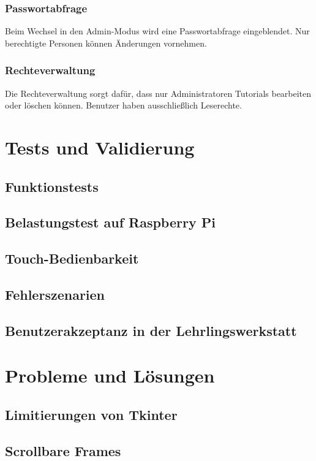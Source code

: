 \documentclass[12pt,a4paper]{report}
\begin{document}
    \subsection{Passwortabfrage}
        Beim Wechsel in den Admin-Modus wird eine Passwortabfrage eingeblendet. Nur berechtigte Personen können Änderungen vornehmen.
    \subsection{Rechteverwaltung}
    Die Rechteverwaltung sorgt dafür, dass nur Administratoren Tutorials bearbeiten oder löschen können. Benutzer haben ausschließlich Leserechte.


\chapter{Tests und Validierung}


    \section{Funktionstests}
    \section{Belastungstest auf Raspberry Pi}
    \section{Touch-Bedienbarkeit}
    \section{Fehlerszenarien}
    \section{Benutzerakzeptanz in der Lehrlingswerkstatt}


\chapter{Probleme und Lösungen}


    \section{Limitierungen von Tkinter}
    \section{Scrollbare Frames}
\end{document}
